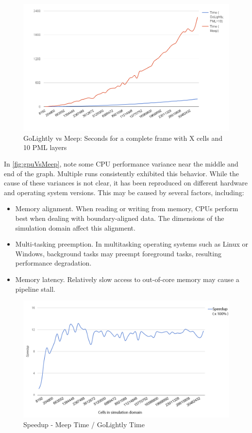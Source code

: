 \begin{figure}[H]
	\centering
	\includegraphics[width=\textwidth,
	keepaspectratio]{gpu-vs-meep.png}
	\caption{GoLightly vs Meep: Seconds for a complete frame with X cells and 10 PML layers}
	\label{fig:gpuVsMeep}
\end{figure}

In \autoref{fig:gpuVsMeep}, note some CPU performance variance near the middle and end of the graph. Multiple runs consistently exhibited this behavior. While the cause of these variances is not clear, it has been reproduced on different hardware and operating system versions. 
This may be caused by several factors, including:

\begin{itemize}
	\item Memory alignment. When reading or writing from memory, CPUs perform best when dealing with boundary-aligned data. The dimensions of the simulation domain affect this alignment.
	\item Multi-tasking preemption. In multitasking operating systems such as Linux or Windows, background tasks may preempt foreground tasks, resulting performance degradation. 
	\item Memory latency. Relatively slow access to out-of-core memory may cause a pipeline stall.	
\end{itemize}


\begin{figure}[H]
	\centering
	\includegraphics[width=\textwidth,
	keepaspectratio]{gpu-vs-meep-speedup.png}
	\caption{Speedup - Meep Time / GoLightly Time}
	\label{fig:gpuVsMeepSpeedup}
\end{figure}

